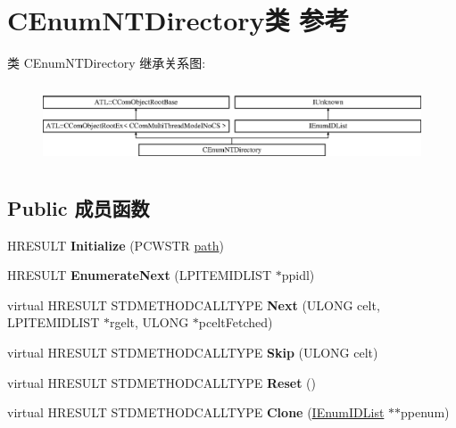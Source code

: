 \hypertarget{class_c_enum_n_t_directory}{}\section{C\+Enum\+N\+T\+Directory类 参考}
\label{class_c_enum_n_t_directory}
类 C\+Enum\+N\+T\+Directory 继承关系图\+:\begin{figure}[H]
\begin{center}
\leavevmode
\includegraphics[height=2.386364cm]{class_c_enum_n_t_directory}
\end{center}
\end{figure}
\subsection*{Public 成员函数}
\begin{DoxyCompactItemize}
\item 
\mbox{\label{class_c_enum_n_t_directory_ab9abe4c315f8733aabc9f83f946102ae}} 
H\+R\+E\+S\+U\+LT {\bfseries Initialize} (P\+C\+W\+S\+TR \hyperlink{structpath}{path})
\item 
\mbox{\label{class_c_enum_n_t_directory_a52931a690a009a0f8328f04d91cdeb75}} 
H\+R\+E\+S\+U\+LT {\bfseries Enumerate\+Next} (L\+P\+I\+T\+E\+M\+I\+D\+L\+I\+ST $\ast$ppidl)
\item 
\mbox{\label{class_c_enum_n_t_directory_a6dcfd399684f621faad09a781528cdbf}} 
virtual H\+R\+E\+S\+U\+LT S\+T\+D\+M\+E\+T\+H\+O\+D\+C\+A\+L\+L\+T\+Y\+PE {\bfseries Next} (U\+L\+O\+NG celt, L\+P\+I\+T\+E\+M\+I\+D\+L\+I\+ST $\ast$rgelt, U\+L\+O\+NG $\ast$pcelt\+Fetched)
\item 
\mbox{\label{class_c_enum_n_t_directory_a69560ff5ef66474fdf104e647caf6f10}} 
virtual H\+R\+E\+S\+U\+LT S\+T\+D\+M\+E\+T\+H\+O\+D\+C\+A\+L\+L\+T\+Y\+PE {\bfseries Skip} (U\+L\+O\+NG celt)
\item 
\mbox{\label{class_c_enum_n_t_directory_abf9c2415a047782e429d89594efe6710}} 
virtual H\+R\+E\+S\+U\+LT S\+T\+D\+M\+E\+T\+H\+O\+D\+C\+A\+L\+L\+T\+Y\+PE {\bfseries Reset} ()
\item 
\mbox{\label{class_c_enum_n_t_directory_a85db81c0a53f5f0fd8038d5e540c15cd}} 
virtual H\+R\+E\+S\+U\+LT S\+T\+D\+M\+E\+T\+H\+O\+D\+C\+A\+L\+L\+T\+Y\+PE {\bfseries Clone} (\hyperlink{interface_i_enum_i_d_list}{I\+Enum\+I\+D\+List} $\ast$$\ast$ppenum)
\end{DoxyCompactItemize}
